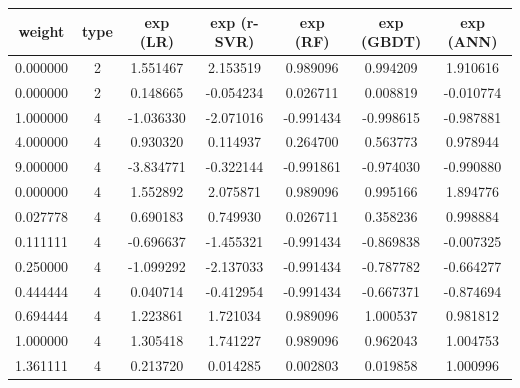 \begin{table}[htbp]
  \centering
  \begin{tabular}{@{}ccccccc@{}}
  \toprule
  \textbf{weight} & \textbf{type} & \textbf{exp (LR)} & \textbf{exp (r-SVR)} & \textbf{exp (RF)} & \textbf{exp (GBDT)} & \textbf{exp (ANN)} \\ \midrule
  0.000000        & 2             & 1.551467          & 2.153519             & 0.989096          & 0.994209            & 1.910616           \\
  0.000000        & 2             & 0.148665          & -0.054234            & 0.026711          & 0.008819            & -0.010774          \\
  1.000000        & 4             & -1.036330         & -2.071016            & -0.991434         & -0.998615           & -0.987881          \\
  4.000000        & 4             & 0.930320          & 0.114937             & 0.264700          & 0.563773            & 0.978944           \\
  9.000000        & 4             & -3.834771         & -0.322144            & -0.991861         & -0.974030           & -0.990880          \\
  0.000000        & 4             & 1.552892          & 2.075871             & 0.989096          & 0.995166            & 1.894776           \\
  0.027778        & 4             & 0.690183          & 0.749930             & 0.026711          & 0.358236            & 0.998884           \\
  0.111111        & 4             & -0.696637         & -1.455321            & -0.991434         & -0.869838           & -0.007325          \\
  0.250000        & 4             & -1.099292         & -2.137033            & -0.991434         & -0.787782           & -0.664277          \\
  0.444444        & 4             & 0.040714          & -0.412954            & -0.991434         & -0.667371           & -0.874694          \\
  0.694444        & 4             & 1.223861          & 1.721034             & 0.989096          & 1.000537            & 0.981812           \\
  1.000000        & 4             & 1.305418          & 1.741227             & 0.989096          & 0.962043            & 1.004753           \\
  1.361111        & 4             & 0.213720          & 0.014285             & 0.002803          & 0.019858            & 1.000996           \\

\end{tabular}
\end{table}
